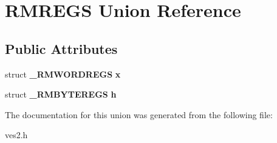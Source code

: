 \section{R\-M\-R\-E\-G\-S Union Reference}
\label{unionRMREGS}
\subsection*{Public Attributes}
\begin{DoxyCompactItemize}
\item 
struct {\bf \-\_\-\-R\-M\-W\-O\-R\-D\-R\-E\-G\-S} {\bfseries x}\label{unionRMREGS_ac2013758a3db9700f85edccb4b60c306}

\item 
struct {\bf \-\_\-\-R\-M\-B\-Y\-T\-E\-R\-E\-G\-S} {\bfseries h}\label{unionRMREGS_ae607f7df5ab4ef629d92274b2af17585}

\end{DoxyCompactItemize}


The documentation for this union was generated from the following file\-:\begin{DoxyCompactItemize}
\item 
ves2.\-h\end{DoxyCompactItemize}
